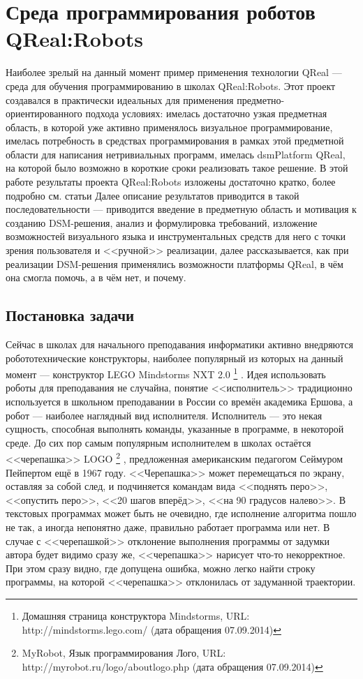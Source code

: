 \section{Среда программирования роботов QReal:Robots}
\label{chapter:qRealRobots}
Наиболее зрелый на данный момент пример применения технологии QReal --- среда для 
обучения программированию в школах QReal:Robots. Этот проект создавался в практически 
идеальных для применения предметно-ориентированного подхода условиях: имелась достаточно 
узкая предметная область, в которой уже активно применялось визуальное программирование, 
имелась потребность в средствах программирования в рамках этой предметной области для 
написания нетривиальных программ, имелась \ac{dsmPlatform} QReal, на которой было возможно 
в короткие сроки реализовать такое решение. В этой работе результаты проекта QReal:Robots изложены достаточно кратко, более подробно см. статьи
\cite{bryksin2011robots, tikhonova2012robots, litvinov2012robots, terekhov2013robots}
Далее описание результатов приводится в такой последовательности --- приводится введение 
в предметную область и мотивация к созданию \ac{DSM}-решения, анализ и формулировка требований, 
изложение возможностей визуального языка и инструментальных средств для него с точки 
зрения пользователя и <<ручной>> реализации, далее рассказывается, как при реализации 
\ac{DSM}-решения применялись возможности платформы QReal, в чём она смогла помочь, а в чём нет, и почему.

\subsection{Постановка задачи}
Сейчас в школах для начального преподавания информатики активно внедряются робототехнические 
конструкторы, наиболее популярный из которых на данный момент --- конструктор LEGO Mindstorms NXT 2.0%
\footnote{Домашняя страница конструктора Mindstorms, URL: http://mindstorms.lego.com/ (дата обращения 07.09.2014)}%
. Идея использовать роботы для преподавания не случайна, понятие <<исполнитель>> традиционно 
используется в школьном преподавании в России со времён академика Ершова, а робот --- наиболее 
наглядный вид исполнителя. Исполнитель --- это некая сущность, способная выполнять 
команды, указанные в программе, в некоторой среде. До сих пор самым популярным исполнителем 
в школах остаётся <<черепашка>> LOGO%
\footnote{MyRobot, Язык программирования Лого, URL: http://myrobot.ru/logo/aboutlogo.php (дата обращения 07.09.2014)}%
, предложенная американским педагогом Сеймуром Пейпертом ещё в 1967 году. <<Черепашка>> 
может перемещаться по экрану, оставляя за собой след, и подчиняется командам вида <<поднять перо>>, 
<<опустить перо>>, <<20 шагов вперёд>>, <<на 90 градусов налево>>. В текстовых программах 
может быть не очевидно, где исполнение алгоритма пошло не так, а иногда непонятно 
даже, правильно работает программа или нет. В случае с <<черепашкой>> отклонение выполнения 
программы от задумки автора будет видимо сразу же, <<черепашка>> нарисует что-то некорректное. 
При этом сразу видно, где допущена ошибка, можно легко найти строку программы, на 
которой <<черепашка>> отклонилась от задуманной траектории.

